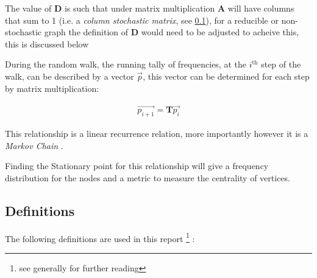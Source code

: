 \documentclass[11pt]{article}
\begin{document}
The value of \(\mathbf{D}\) is such that under matrix multiplication
\(\mathbf{A}\) will have columns that sum to 1 (i.e. a \emph{column
stochastic matrix}, see \textsection \ref{definitions}), for a reducible
or non-stochastic graph the definition of \(\mathbf{D}\) would need to
be adjusted to acheive this, this is discussed below 

During the random walk, the running tally of frequencies, at the
\(i^{\mathrm{th}}\) step of the walk, can be described by a vector
\(\vec{p}\), this vector can be determined for each step by matrix
multiplication:

\begin{align}
\vec{p_{i+1}} = \mathbf{T}\vec{p_{i}} \label{eq:recurrence}
\end{align}

This relationship is a linear recurrence relation, more importantly
however it is a \emph{Markov Chain}
\cite[]{langvilleGooglePageRankScience2012}.

Finding the Stationary point for this relationship will give a
frequency distribution for the nodes and a metric to measure the
centrality of vertices.

\subsection{Definitions}
\label{definitions}
The following definitions are used in this report \footnote{see generally \cite[Ch. 15]{langvilleGooglePageRankScience2012} for further reading} :
\end{document}
